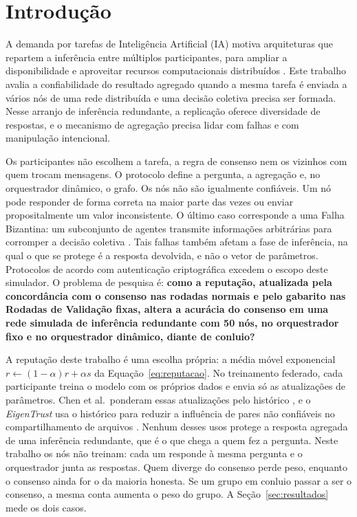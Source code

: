 \documentclass[12pt]{article}
\begin{document}
\section{Introdução}

A demanda por tarefas de Inteligência Artificial (IA) motiva arquiteturas que repartem a inferência entre múltiplos participantes, para ampliar a disponibilidade e aproveitar recursos computacionais distribuídos \cite{shi2016,tanenbaum2017,coulouris2021,russell2020}. Este trabalho avalia a confiabilidade do resultado agregado quando a mesma tarefa é enviada a vários nós de uma rede distribuída e uma decisão coletiva precisa ser formada. Nesse arranjo de inferência redundante, a replicação oferece diversidade de respostas, e o mecanismo de agregação precisa lidar com falhas e com manipulação intencional.

Os participantes não escolhem a tarefa, a regra de consenso nem os vizinhos com quem trocam mensagens. O protocolo define a pergunta, a agregação e, no orquestrador dinâmico, o grafo. Os nós não são igualmente confiáveis. Um nó pode responder de forma correta na maior parte das vezes ou enviar propositalmente um valor inconsistente. O último caso corresponde a uma Falha Bizantina: um subconjunto de agentes transmite informações arbitrárias para corromper a decisão coletiva \cite{lamport1982,castro1999}. Tais falhas também afetam a fase de inferência, na qual o que se protege é a resposta devolvida, e não o vetor de parâmetros. Protocolos de acordo com autenticação criptográfica excedem o escopo deste simulador. O problema de pesquisa é: \textbf{como a reputação, atualizada pela concordância com o consenso nas rodadas normais e pelo gabarito nas Rodadas de Validação fixas, altera a acurácia do consenso em uma rede simulada de inferência redundante com 50 nós, no orquestrador fixo e no orquestrador dinâmico, diante de conluio?}

A reputação deste trabalho é uma escolha própria: a média móvel exponencial $r \leftarrow (1-\alpha)r + \alpha s$ da Equação~\ref{eq:reputacao}. No treinamento federado, cada participante treina o modelo com os próprios dados e envia só as atualizações de parâmetros. Chen et al.\ ponderam essas atualizações pelo histórico \cite{chen2024}, e o \textit{EigenTrust} usa o histórico para reduzir a influência de pares não confiáveis no compartilhamento de arquivos \cite{kamvar2003}. Nenhum desses usos protege a resposta agregada de uma inferência redundante, que é o que chega a quem fez a pergunta. Neste trabalho os nós não treinam: cada um responde à mesma pergunta e o orquestrador junta as respostas. Quem diverge do consenso perde peso, enquanto o consenso ainda for o da maioria honesta. Se um grupo em conluio passar a ser o consenso, a mesma conta aumenta o peso do grupo. A Seção~\ref{sec:resultados} mede os dois casos.
\end{document}
